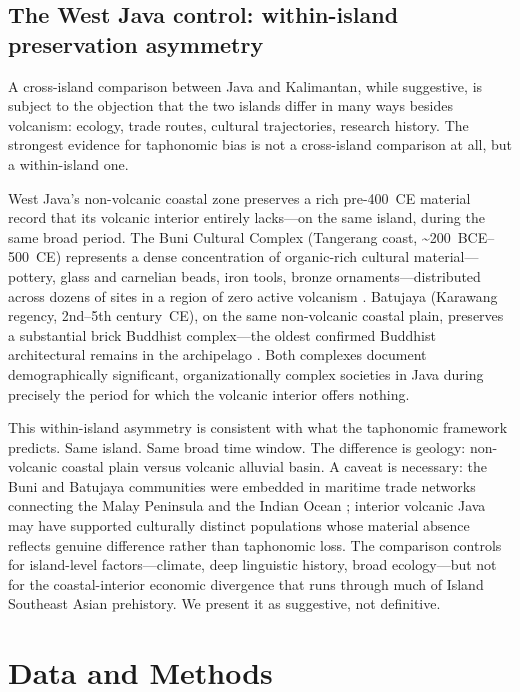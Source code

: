 \documentclass[12pt,a4paper]{article}
\begin{document}
\subsection{The West Java control: within-island preservation asymmetry}

A cross-island comparison between Java and Kalimantan, while suggestive, is subject to the objection that the two islands differ in many ways besides volcanism: ecology, trade routes, cultural trajectories, research history. The strongest evidence for taphonomic bias is not a cross-island comparison at all, but a within-island one.

West Java's non-volcanic coastal zone preserves a rich pre-400~CE material record that its volcanic interior entirely lacks---on the same island, during the same broad period. The Buni Cultural Complex (Tangerang coast, \textasciitilde200~BCE--500~CE) represents a dense concentration of organic-rich cultural material---pottery, glass and carnelian beads, iron tools, bronze ornaments---distributed across dozens of sites in a region of zero active volcanism \citep{wibisono1994,bellina2014}. Batujaya (Karawang regency, 2nd--5th century~CE), on the same non-volcanic coastal plain, preserves a substantial brick Buddhist complex---the oldest confirmed Buddhist architectural remains in the archipelago \citep{manguin2011}. Both complexes document demographically significant, organizationally complex societies in Java during precisely the period for which the volcanic interior offers nothing.

This within-island asymmetry is consistent with what the taphonomic framework predicts. Same island. Same broad time window. The difference is geology: non-volcanic coastal plain versus volcanic alluvial basin. A caveat is necessary: the Buni and Batujaya communities were embedded in maritime trade networks connecting the Malay Peninsula and the Indian Ocean \citep{bellina2014,manguin2011}; interior volcanic Java may have supported culturally distinct populations whose material absence reflects genuine difference rather than taphonomic loss. The comparison controls for island-level factors---climate, deep linguistic history, broad ecology---but not for the coastal-interior economic divergence that runs through much of Island Southeast Asian prehistory. We present it as suggestive, not definitive.

\section{Data and Methods}
\end{document}
